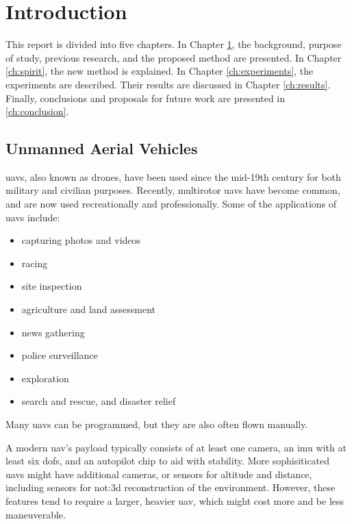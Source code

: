 \chapter{Introduction}
\label{ch:intro}
This report is divided into five chapters.
In Chapter \ref{ch:intro}, the background, purpose of study, previous research, and the proposed method are presented.
In Chapter \ref{ch:spirit}, the new method is explained.
In Chapter \ref{ch:experiments}, the experiments are described.
Their results are discussed in Chapter \ref{ch:results}.
Finally, conclusions and proposals for future work are presented in \ref{ch:conclusion}.

\section{Unmanned Aerial Vehicles}
\Glspl{uav}, also known as drones, have been used since the mid-19th century for both military and civilian purposes.
Recently, multirotor \glspl{uav} have become common, and are now used recreationally and professionally.
Some of the applications of \glspl{uav} include:

\begin{itemize}
  \item capturing photos and videos
  \item racing
  \item site inspection
  \item agriculture and land assessment
  \item news gathering
  \item police surveillance
  \item exploration
  \item search and rescue, and disaster relief
\end{itemize}

Many \glspl{uav} can be programmed, but they are also often flown manually.

A modern \gls{uav}'s payload typically consists of at least one camera, an \gls{imu} with at least six \glspl{dof}, and an autopilot chip to aid with stability.
More sophisiticated \glspl{uav} might have additional cameras, or sensors for altitude and distance, including sensors for \gls{not:3d} reconstruction of the environment.
However, these features tend to require a larger, heavier \gls{uav}, which might cost more and be less maneuverable.

